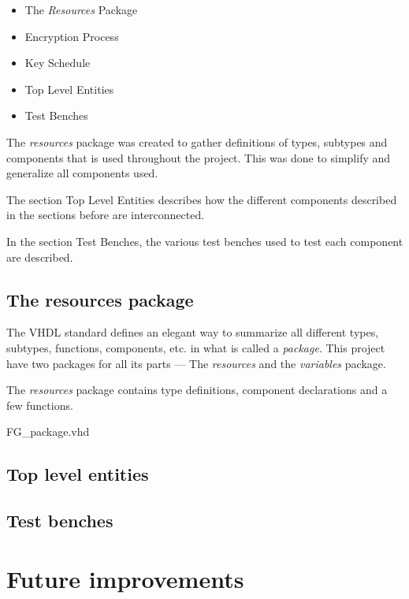 \documentclass{report}
\begin{document}
\begin{itemize}
\item The \emph{Resources} Package
\item Encryption Process
\item Key Schedule
\item Top Level Entities
\item Test Benches
\end{itemize}

The \emph{resources} package was created to gather definitions of types, subtypes and components that is used throughout the project. This was done to simplify and generalize all components used.

The section Top Level Entities describes how the different components described in the sections before are interconnected.

In the section Test Benches, the various test benches used to test each component are described.

\section{The resources package}
The VHDL standard defines an elegant way to summarize all different types, subtypes, functions, components, etc. in what is called a \emph{package}. This project have two packages for all its parts --- The \emph{resources} and the \emph{variables} package.

The \emph{resources} package contains type definitions, component declarations and a few functions.


{FG_package.vhd}





\section{Top level entities}

\section{Test benches}


\chapter{Future improvements}
\end{document}
